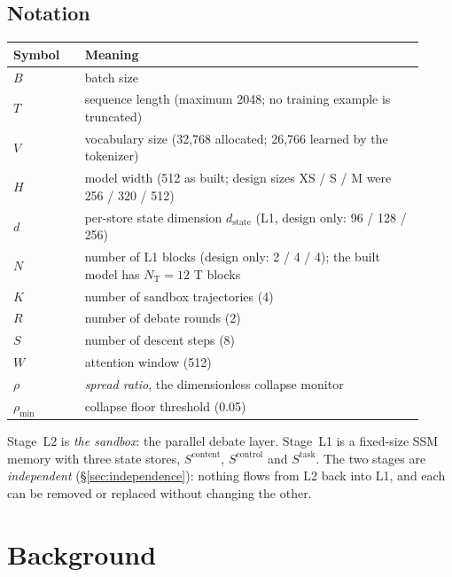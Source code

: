 \documentclass[11pt,a4paper]{article}
\newcommand{\sdim}{d_{\text{state}}}
\newcommand{\rhodim}{\rho}
\theoremstyle{plain}
\theoremstyle{definition}
\theoremstyle{remark}
\begin{document}
\subsection{Notation}

\begin{center}
\small
\begin{tabular}{@{}>{\raggedright\arraybackslash}p{0.16\linewidth}>{\raggedright\arraybackslash}p{0.76\linewidth}@{}}
\toprule
\rowcolor{ekHeadBG}\color{white}\textbf{Symbol} & \color{white}\textbf{Meaning} \\
\midrule
$B$ & batch size \\
$T$ & sequence length (maximum 2048; no training example is truncated) \\
$V$ & vocabulary size (32{,}768 allocated; 26{,}766 learned by the tokenizer) \\
$H$ & model width (512 as built; design sizes XS / S / M were 256 / 320 / 512) \\
$d$ & per-store state dimension $\sdim$ (L1, design only: 96 / 128 / 256) \\
$N$ & number of L1 blocks (design only: 2 / 4 / 4); the built model has $N_{\mathrm{T}}{=}12$ T blocks \\
$K$ & number of sandbox trajectories (4) \\
$R$ & number of debate rounds (2) \\
$S$ & number of descent steps (8) \\
$W$ & attention window (512) \\
$\rhodim$ & \emph{spread ratio}, the dimensionless collapse monitor \\
$\rhodim_{\min}$ & collapse floor threshold (0.05) \\
\bottomrule
\end{tabular}
\end{center}

\noindent
Stage~L2 is \emph{the sandbox}: the parallel debate layer. Stage~L1 is a
fixed-size SSM memory with three state stores, $S^{\mathrm{content}}$,
$S^{\mathrm{control}}$ and $S^{\mathrm{task}}$. The two stages are
\emph{independent} (\S\ref{sec:independence}): nothing flows from L2 back into
L1, and each can be removed or replaced without changing the other.

\section{Background}
\end{document}
